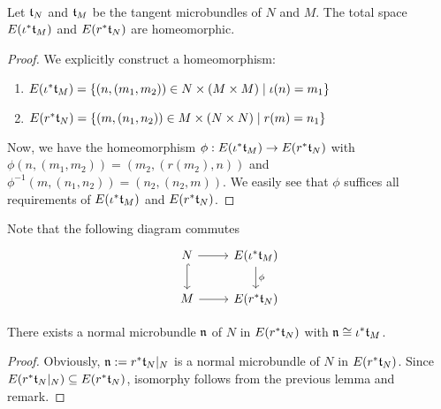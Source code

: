  \\
Let $\mathfrak{t}_N$ and $\mathfrak{t}_M$ be the tangent microbundles of $N$ and $M$.
The total space $E(\iota^*\mathfrak{t}_M)$ and $E(r^*\mathfrak{t}_N)$ are homeomorphic.
\begin{proof}
We explicitly construct a homeomorphism:
\begin{enumerate}
    \item $E(\iota^*\mathfrak{t}_M) = \{ (n, (m_1, m_2)) \in N \times (M \times M) \mid \iota(n) = m_1\}$
    \item $E(r^*\mathfrak{t}_N) = \{ (m, (n_1, n_2)) \in M \times (N \times N) \mid r(m) = n_1\}$
\end{enumerate}
Now, we have the homeomorphism $\phi: E(\iota^*\mathfrak{t}_M) \to E(r^*\mathfrak{t}_N)$ with
$\phi(n, (m_1, m_2)) = (m_2, (r(m_2), n))$ and $\phi^{-1}(m, (n_1, n_2)) = (n_2, (n_2, m))$.
We easily see that $\phi$ suffices all requirements of $E(\iota^*\mathfrak{t}_M)$ and $E(r^*\mathfrak{t}_N)$.
\end{proof}
\begin{remark}
Note that the following diagram commutes
\[\begin{tikzcd}
    N \ar[r] \ar[hookrightarrow]{d} & E(\iota^*\bt_M) \ar[d, "\phi"] \\
    M \ar[r] & E(r^*\bt_N)
\end{tikzcd}\]
\end{remark}

There exists a normal microbundle $\mathfrak{n}$ of $N$ in $E(r^*\mathfrak{t}_N)$ with $\mathfrak{n} \cong \iota^*\mathfrak{t}_M$.
\begin{proof}
Obviously, $\mathfrak{n} := r^*\mathfrak{t}_N \vert_{N}$ is a normal microbundle of $N$ in $E(r^*\mathfrak{t}_N)$.
Since $E(r^*\mathfrak{t}_N \vert_{N}) \subseteq E(r^*\mathfrak{t}_N)$, isomorphy follows from the previous lemma and remark.
\end{proof}